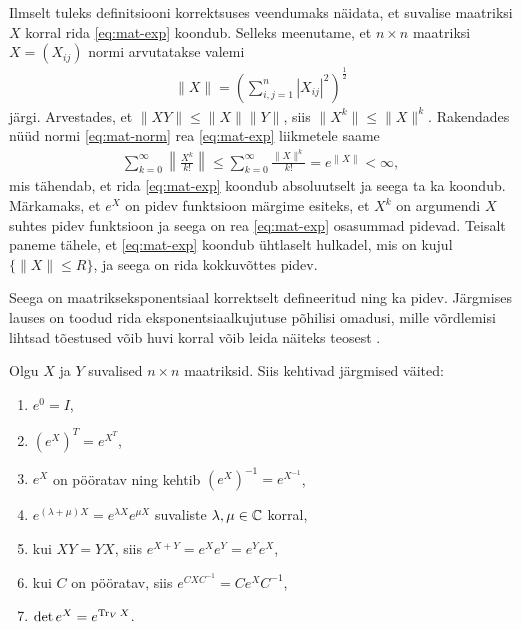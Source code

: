 Ilmselt tuleks definitsiooni korrektsuses veendumaks näidata, et suvalise
maatriksi $X$ korral rida \eqref{eq:mat-exp} koondub. Selleks meenutame,
et $n \times n$ maatriksi $X = (X_{ij})$ normi arvutatakse valemi
\begin{align}\label{eq:mat-norm}
    \| X \| = \left( \sum_{i,j=1}^n |X_{ij}|^2 \right)^{\frac{1}{2}}
\end{align}
järgi. Arvestades, et $\| XY \| \le \|X\| \|Y\|$, siis $\|X^k\| \le \|X\|^k$.
Rakendades nüüd normi \eqref{eq:mat-norm} rea \eqref{eq:mat-exp} liikmetele
saame
\begin{align*}
    \sum_{k=0}^\infty \left\lVert \frac{X^k}{k!} \right\rVert \le
    \sum_{k=0}^\infty \frac{\|X\|^k}{k!} = e^{\|X\|} < \infty,
\end{align*}
mis tähendab, et rida \eqref{eq:mat-exp} koondub absoluutselt ja seega
ta ka koondub. Märkamaks, et $e^X$ on pidev funktsioon märgime esiteks,
et $X^k$ on argumendi $X$ suhtes pidev funktsioon ja seega on rea
\eqref{eq:mat-exp} osasummad pidevad. Teisalt paneme tähele, et
\eqref{eq:mat-exp} koondub ühtlaselt hulkadel, mis on kujul
$\{ \|X\| \le R \}$, ja seega on rida kokkuvõttes pidev.

Seega on maatrikseksponentsiaal korrektselt defineeritud ning ka pidev.
Järgmises lauses on toodud rida eksponentsiaalkujutuse põhilisi omadusi,
mille võrdlemisi lihtsad tõestused võib huvi korral võib leida näiteks
teosest \cite{hall2003lie}.

\begin{lau}\label{lau:mat-exp-om}
    Olgu $X$ ja $Y$ suvalised $n \times n$ maatriksid. Siis kehtivad järgmised
    väited:
    \begin{enumerate}[label=\arabic*)]
        \item\label{om:mat-exp-1} $e^0 = I$,
        \item\label{om:mat-exp-2} $\left(e^X\right)^T = e^{X^T}$,
        \item\label{om:mat-exp-3} $e^X$ on pööratav ning kehtib
            $\left(e^X\right)^{-1} = e^{X^{-1}}$,
        \item\label{om:mat-exp-4} $e^{(\lambda + \mu)X} = e^{\lambda X} e^{\mu X}$ suvaliste
            $\lambda, \mu \in \mathbb{C}$ korral,
        \item\label{om:mat-exp-5} kui $XY = YX$, siis $e^{X+Y} = e^X e^Y = e^Y e^X$,
        \item\label{om:mat-exp-6}  kui $C$ on pööratav, siis $e^{CXC^{-1}} = C e^X C^{-1}$,
        \item\label{om:mat-exp-7} $\det e^X = e^{\operatorname{Tr}_V X}$.
    \end{enumerate}
\end{lau}

